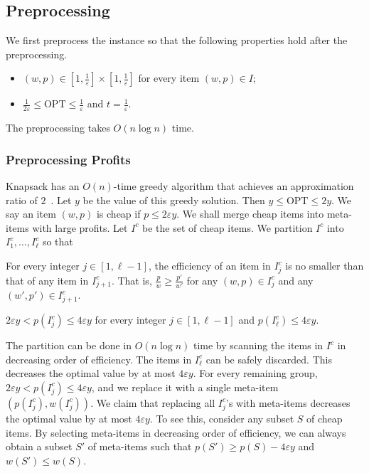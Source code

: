 \documentclass[a4paper,UKenglish,cleveref, autoref, thm-restate, pdfa]{lipics-v2021}
\newcommand{\eps}{\varepsilon}
\renewcommand{\leq}{\leqslant}
\renewcommand{\geq}{\geqslant}
\begin{document}
\subsection{Preprocessing}
We first preprocess the instance so that the following properties hold after the preprocessing.
\begin{itemize}
    \item $(w, p) \in [1, \frac{1}{\eps}] \times [1, \frac{1}{\eps}]$ for every item $(w, p) \in I$;

    \item $\frac{1}{2\eps} \leq \mathrm{OPT} \leq \frac{1}{\eps}$ and $t = \frac{1}{\eps}$.
\end{itemize}
The preprocessing takes $O(n \log n)$ time.

\subsubsection{Preprocessing Profits}
Knapsack has an $O(n)$-time greedy algorithm that achieves an approximation ratio of $2$~\cite[Section 2.5]{KPD04}. Let $y$ be the value of this greedy solution. Then $y \leq \mathrm{OPT} \leq 2y$. We say an item $(w, p)$ is cheap if $p \leq 2\eps y$. We shall merge cheap items into meta-items with large profits.  Let $I^c$ be the set of cheap items. We partition $I^c$ into $I^c_1, \ldots, I^c_\ell$ so that
\begin{romanenumerate}
    \item For every integer $j \in [1, \ell-1]$, the efficiency of an item in $I^c_j$ is no smaller than that of any item in $I^c_{j+1}$. That is, $\frac{p}{w} \geq \frac{p'}{w'}$ for any $(w, p) \in I^c_j$ and any $(w', p') \in I^c_{j+1}$.

    \item $2\eps y < p(I^c_j) \leq 4\eps y$ for every integer $j \in [1, \ell - 1]$ and $p(I^c_\ell) \leq 4\eps y$. 
\end{romanenumerate}
The partition can be done in $O(n \log n)$ time by scanning the items in $I^c$ in decreasing order of efficiency. The items in $I^c_\ell$ can be safely discarded. This decreases the optimal value by at most $4\eps y$.  For every remaining group, $2\eps y < p(I^c_j) \leq 4\eps y$, and we replace it with a single meta-item $(p(I^c_j), w(I^c_j))$. We claim that replacing all $I^c_j$'s with meta-items decreases the optimal value by at most $4\eps y$. To see this, consider any subset $S$ of cheap items. By selecting meta-items in decreasing order of efficiency, we can always obtain a subset $S'$ of meta-items such that $p(S') \geq p(S) - 4\eps y$ and $w(S') \leq w(S)$.
\end{document}
